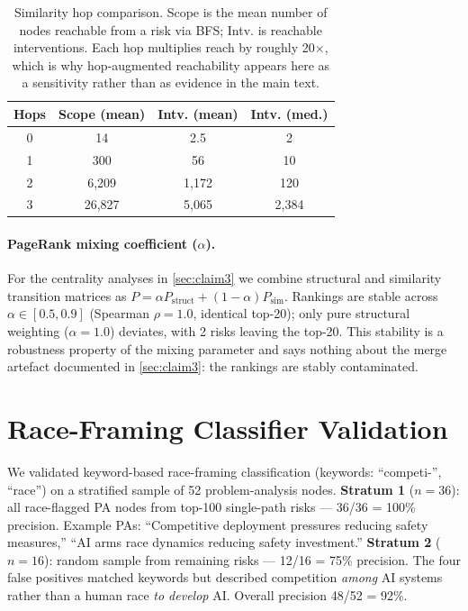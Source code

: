 \documentclass[10pt,twocolumn,letterpaper]{article}
\begin{document}
\begin{table}[h]
\centering
\footnotesize
\begin{tabular}{cccc}
\toprule
\textbf{Hops} & \textbf{Scope (mean)} & \textbf{Intv. (mean)} & \textbf{Intv. (med.)} \\
\midrule
0 & 14 & 2.5 & 2 \\
1 & 300 & 56 & 10 \\
2 & 6,209 & 1,172 & 120 \\
3 & 26,827 & 5,065 & 2,384 \\
\bottomrule
\end{tabular}
\caption{Similarity hop comparison. Scope is the mean number of nodes reachable
from a risk via BFS; Intv. is reachable interventions. Each hop multiplies reach
by roughly 20$\times$, which is why hop-augmented reachability appears here as a
sensitivity rather than as evidence in the main text.}
\label{tab:sim-hops}
\end{table}

\paragraph{PageRank mixing coefficient ($\alpha$).}
For the centrality analyses in \cref{sec:claim3} we combine structural and
similarity transition matrices as
$P = \alpha P_{\text{struct}} + (1-\alpha) P_{\text{sim}}$.
Rankings are stable across $\alpha \in [0.5, 0.9]$ (Spearman $\rho = 1.0$,
identical top-20); only pure structural weighting ($\alpha = 1.0$) deviates, with
2 risks leaving the top-20. This stability is a robustness property of the mixing
parameter and says nothing about the merge artefact documented in
\cref{sec:claim3}: the rankings are stably contaminated.

\section{Race-Framing Classifier Validation}
\label{app:race}

We validated keyword-based race-framing classification (keywords: ``competi-'',
``race'') on a stratified sample of 52 problem-analysis nodes.
\textbf{Stratum 1} ($n{=}36$): all race-flagged PA nodes from top-100 single-path
risks --- 36/36 = 100\% precision. Example PAs: ``Competitive deployment
pressures reducing safety measures,'' ``AI arms race dynamics reducing safety
investment.'' \textbf{Stratum 2} ($n{=}16$): random sample from remaining risks
--- 12/16 = 75\% precision. The four false positives matched keywords but
described competition \emph{among} AI systems rather than a human race \emph{to
develop} AI. Overall precision 48/52 = 92\%.
\end{document}
